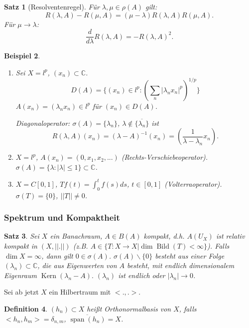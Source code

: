 \documentclass[12pt,a4paper,titlepage]{scrartcl}
\newtheorem{Satz}{Satz}[subsection]
\newtheorem{Definition}[Satz]{Definition}
\newtheorem{Beispiel}[Satz]{Beispiel}
\DeclareMathOperator{\Kern}{Kern}
\DeclareMathOperator{\Bild}{Bild}
\DeclareMathOperator{\spann}{span}
\numberwithin{equation}{section}
\newcommand{\C}{\mathbb{C}} %
\begin{document}
	
	\begin{Satz}[Resolventenregel]
		Für $\lambda,\mu\in \rho(A)$ gilt:
		$$R(\lambda,A)-R(\mu,A) = (\mu-\lambda)R(\lambda,A)R(\mu,A).$$
		Für $\mu\rightarrow \lambda$:
		$$\frac{d}{d\lambda}R(\lambda,A) = -R(\lambda,A)^2.$$
	\end{Satz}
	
	\begin{Beispiel}~
		\begin{enumerate}
			\item[a)] Sei $X=l^p$, $(x_n)\subset\C$.
			$$D(A) = \{(x_n)\in l^p: (\sum_n |\lambda_n x_n|^p)^{1/p} \}$$
			$A(x_n) = (\lambda_n x_n)\in l^p$ für $(x_n)\in D(A)$.
			
			Diagonaloperator: $\sigma(A) = \{\lambda_n\}$, $\lambda\notin \overline{\{\lambda_n\}}$ ist 
			$$R(\lambda,A)(x_n) = (\lambda-A)^{-1}(x_n) = (\frac{1}{\lambda-\lambda_n}x_n).$$
			\item[b)] $X=l^p$, $A(x_n) = (0,x_1,x_2,...)$ (Rechts-Verschiebeoperator). $\sigma(A) = \{\lambda:|\lambda|\leq 1 \}\subset \C$. 
			\item[c)] $X = C[0,1]$, $Tf(t) = \int_0^t f(s)ds$, $t\in [0,1]$ (Volterraoperator). $\sigma(T) = \{0\}$, $||T|| \neq 0$.
		\end{enumerate}
	\end{Beispiel}
	
	\subsubsection{Spektrum und Kompaktheit}
	
	\begin{Satz}
		Sei $X$ ein Banachraum, $A\in B(A)$ kompakt, d.h. $A(U_X)$ ist relativ kompakt in $(X,||.||)$ (z.B. $A\in \{T: X\rightarrow X |\dim\Bild(T)<\infty \}$). Falls $\dim X = \infty$, dann gilt $0\in \sigma(A)$. $\sigma(A)\backslash \{0\}$ besteht aus einer Folge $(\lambda_n)\subset \C$, die aus Eigenwerten von $A$ besteht, mit endlich dimensionalem Eigenraum $\Kern(\lambda_n-A).$ $(\lambda_n)$ ist endlich oder $|\lambda_n|\rightarrow 0$.
	\end{Satz}
	
	Sei ab jetzt $X$ ein Hilbertraum mit $<.,.>$. 
	
	\begin{Definition}
		$(h_n)\subset X$ heißt Orthonormalbasis von $X$, falls $<h_n, h_m> = \delta_{n,m}$, $\overline{\spann(h_n)} = X$.
	\end{Definition}
	
\end{document}

